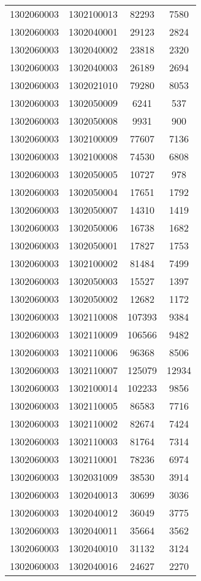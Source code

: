 \begin{longtable}[h]{llcc}
		1302060003 & 1302100013 & 82293 & 7580\\
		1302060003 & 1302040001 & 29123 & 2824\\
		1302060003 & 1302040002 & 23818 & 2320\\
		1302060003 & 1302040003 & 26189 & 2694\\
		1302060003 & 1302021010 & 79280 & 8053\\
		1302060003 & 1302050009 & 6241 & 537\\
		1302060003 & 1302050008 & 9931 & 900\\
		1302060003 & 1302100009 & 77607 & 7136\\
		1302060003 & 1302100008 & 74530 & 6808\\
		1302060003 & 1302050005 & 10727 & 978\\
		1302060003 & 1302050004 & 17651 & 1792\\
		1302060003 & 1302050007 & 14310 & 1419\\
		1302060003 & 1302050006 & 16738 & 1682\\
		1302060003 & 1302050001 & 17827 & 1753\\
		1302060003 & 1302100002 & 81484 & 7499\\
		1302060003 & 1302050003 & 15527 & 1397\\
		1302060003 & 1302050002 & 12682 & 1172\\
		1302060003 & 1302110008 & 107393 & 9384\\
		1302060003 & 1302110009 & 106566 & 9482\\
		1302060003 & 1302110006 & 96368 & 8506\\
		1302060003 & 1302110007 & 125079 & 12934\\
		1302060003 & 1302100014 & 102233 & 9856\\
		1302060003 & 1302110005 & 86583 & 7716\\
		1302060003 & 1302110002 & 82674 & 7424\\
		1302060003 & 1302110003 & 81764 & 7314\\
		1302060003 & 1302110001 & 78236 & 6974\\
		1302060003 & 1302031009 & 38530 & 3914\\
		1302060003 & 1302040013 & 30699 & 3036\\
		1302060003 & 1302040012 & 36049 & 3775\\
		1302060003 & 1302040011 & 35664 & 3562\\
		1302060003 & 1302040010 & 31132 & 3124\\
		1302060003 & 1302040016 & 24627 & 2270\\

\end{longtable}
